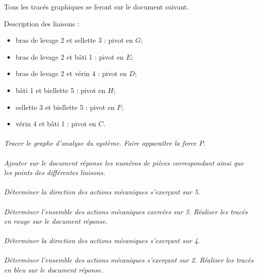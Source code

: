 \documentclass[11pt,oneside]{article}
\begin{document}
Tous les tracés graphiques se feront sur le document suivant.

Description des liaisons : 
\begin{itemize}
\item bras de levage 2 et sellette 3 : pivot en $G$;
\item bras de levage 2 et bâti 1 : pivot en $E$;
\item bras de levage 2 et vérin 4 : pivot en $D$;
\item bâti 1 et biellette 5 : pivot en $H$;
\item sellette 3 et biellette 5 : pivot en $F$;
\item vérin 4 et bâti 1 : pivot en $C$.
\end{itemize}

\paragraph{}
\textit{Tracer le graphe d'analyse du système. Faire apparaître la force $P$.}

\paragraph{}
\textit{Ajouter sur le document réponse les numéros de pièces correspondant ainsi que les points des différentes liaisons.}

\paragraph{}
\textit{Déterminer la direction des actions mécaniques s'exerçant sur 5.}

\paragraph{}
\textit{Déterminer l'ensemble des actions mécaniques exercées sur 3. Réaliser les tracés en rouge sur le document réponse.}

\paragraph{}
\textit{Déterminer la direction des actions mécaniques s'exerçant sur 4.}

\paragraph{}
\textit{Déterminer l'ensemble des actions mécaniques s'exerçant sur 2. Réaliser les tracés en bleu sur le document réponse. }
\end{document}
